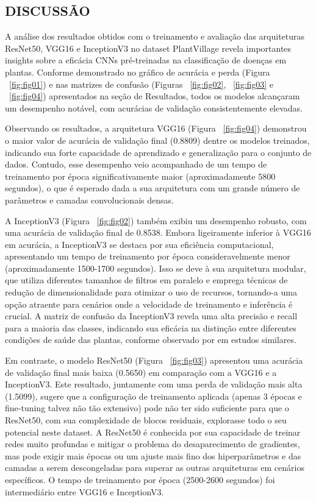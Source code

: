 \documentclass[10pt,conference]{IEEEtran}
\begin{document}
\subsection{DISCUSSÃO}
A análise dos resultados obtidos com o treinamento e avaliação das arquiteturas ResNet50, VGG16 e InceptionV3 no dataset PlantVillage \cite{hughes2015open} revela importantes insights sobre a eficácia CNNs pré-treinadas na classificação de doenças em plantas. Conforme demonstrado no gráfico de acurácia e perda (Figura ~\ref{fig:fig01}) e nas matrizes de confusão (Figuras ~\ref{fig:fig02}, ~\ref{fig:fig03} e ~\ref{fig:fig04}) apresentados na seção de Resultados, todos os modelos alcançaram um desempenho notável, com acurácias de validação consistentemente elevadas. 

Observando os resultados, a arquitetura VGG16 (Figura ~\ref{fig:fig04}) demonstrou o maior valor de acurácia de validação final (0.8809) dentre os modelos treinados, indicando sua forte capacidade de aprendizado e generalização para o conjunto de dados. Contudo, esse desempenho veio acompanhado de um tempo de treinamento por época significativamente maior (aproximadamente 5800 segundos), o que é esperado dada a sua arquitetura com um grande número de parâmetros e camadas convolucionais densas. 

A InceptionV3 (Figura ~\ref{fig:fig02}) também exibiu um desempenho robusto, com uma acurácia de validação final de 0.8538. Embora ligeiramente inferior à VGG16 em acurácia, a InceptionV3 se destaca por sua eficiência computacional, apresentando um tempo de treinamento por época consideravelmente menor (aproximadamente 1500-1700 segundos). Isso se deve à sua arquitetura modular, que utiliza diferentes tamanhos de filtros em paralelo e emprega técnicas de redução de dimensionalidade para otimizar o uso de recursos, tornando-a uma opção atraente para cenários onde a velocidade de treinamento e inferência é crucial. A matriz de confusão da InceptionV3 revela uma alta precisão e recall para a maioria das classes, indicando sua eficácia na distinção entre diferentes condições de saúde das plantas, conforme observado por \cite{mohanty2016deep} em estudos similares. 

Em contraste, o modelo ResNet50 (Figura ~\ref{fig:fig03}) apresentou uma acurácia de validação final mais baixa (0.5650) em comparação com a VGG16 e a InceptionV3. Este resultado, juntamente com uma perda de validação mais alta (1.5099), sugere que a configuração de treinamento aplicada (apenas 3 épocas e fine-tuning talvez não tão extensivo) pode não ter sido suficiente para que o ResNet50, com sua complexidade de blocos residuais, explorasse todo o seu potencial neste dataset. A ResNet50 é conhecida por sua capacidade de treinar redes muito profundas e mitigar o problema do desaparecimento de gradientes, mas pode exigir mais épocas ou um ajuste mais fino dos hiperparâmetros e das camadas a serem descongeladas para superar as outras arquiteturas em cenários específicos. O tempo de treinamento por época (2500-2600 segundos) foi intermediário entre VGG16 e InceptionV3. 
\end{document}
